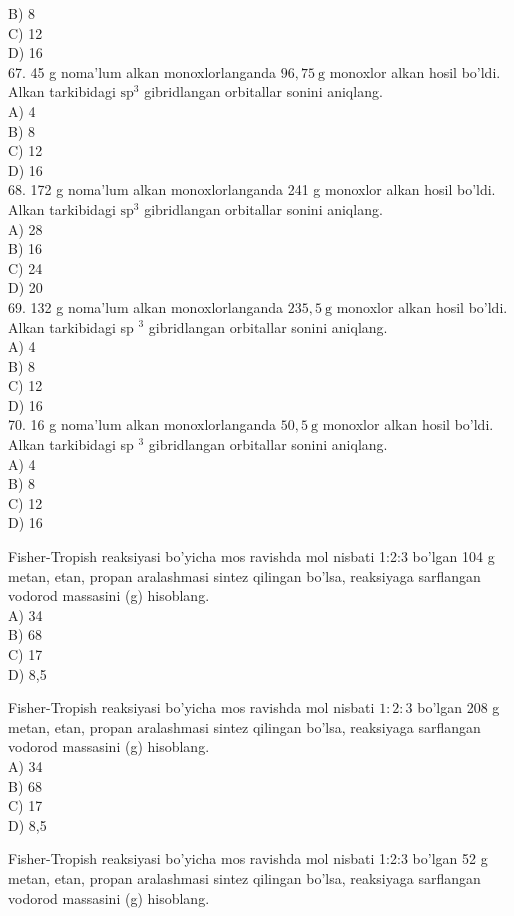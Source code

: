 B) 8\\
C) 12\\
D) 16\\
67. 45 g noma'lum alkan monoxlorlanganda $96,75 \mathrm{~g}$ monoxlor alkan hosil bo'ldi. Alkan tarkibidagi $\mathrm{sp}^{3}$ gibridlangan orbitallar sonini aniqlang.\\
A) 4\\
B) 8\\
C) 12\\
D) 16\\
68. 172 g noma'lum alkan monoxlorlanganda 241 g monoxlor alkan hosil bo'ldi. Alkan tarkibidagi $\mathrm{sp}^{3}$ gibridlangan orbitallar sonini aniqlang.\\
A) 28\\
B) 16\\
C) 24\\
D) 20\\
69. 132 g noma'lum alkan monoxlorlanganda $235,5 \mathrm{~g}$ monoxlor alkan hosil bo'ldi. Alkan tarkibidagi sp ${ }^{3}$ gibridlangan orbitallar sonini aniqlang.\\
A) 4\\
B) 8\\
C) 12\\
D) 16\\
70. 16 g noma'lum alkan monoxlorlanganda $50,5 \mathrm{~g}$ monoxlor alkan hosil bo'ldi. Alkan tarkibidagi sp ${ }^{3}$ gibridlangan orbitallar sonini aniqlang.\\
A) 4\\
B) 8\\
C) 12\\
D) 16
  \item Fisher-Tropish reaksiyasi bo'yicha mos ravishda mol nisbati 1:2:3 bo'lgan 104 g metan, etan, propan aralashmasi sintez qilingan bo'lsa, reaksiyaga sarflangan vodorod massasini (g) hisoblang.\\
A) 34\\
B) 68\\
C) 17\\
D) 8,5
  \item Fisher-Tropish reaksiyasi bo'yicha mos ravishda mol nisbati $1: 2: 3$ bo'lgan 208 g metan, etan, propan aralashmasi sintez qilingan bo'lsa, reaksiyaga sarflangan vodorod massasini (g) hisoblang.\\
A) 34\\
B) 68\\
C) 17\\
D) 8,5
  \item Fisher-Tropish reaksiyasi bo'yicha mos ravishda mol nisbati 1:2:3 bo'lgan 52 g metan, etan, propan aralashmasi sintez qilingan bo'lsa, reaksiyaga sarflangan vodorod massasini (g) hisoblang.\\
